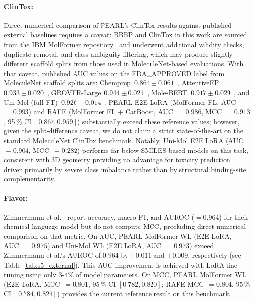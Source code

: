 \documentclass[9pt,a4paper]{article}
\begin{document}
\paragraph{ClinTox:}
Direct numerical comparison of PEARL's ClinTox results against published external baselines
requires a caveat: BBBP and ClinTox in this work are sourced from the IBM MolFormer
repository~\cite{ross2022molformer} and underwent additional validity checks, duplicate removal,
and class-ambiguity filtering, which may produce slightly different scaffold splits from
those used in MoleculeNet-based evaluations.
With that caveat, published AUC values on the FDA\_APPROVED label from MoleculeNet scaffold
splits are: Chemprop~$0.864 \pm 0.061$~\cite{yang2019chemprop},
AttentiveFP~$0.933 \pm 0.020$~\cite{xiong2020attentivefp},
GROVER-Large~$0.944 \pm 0.021$~\cite{rong2020grover},
Mole-BERT~$0.917 \pm 0.029$~\cite{xia2023molecbert}, and
Uni-Mol (full FT)~$0.926 \pm 0.014$~\cite{zhou2023unimol}.
PEARL E2E LoRA (MolFormer FL, AUC~$= 0.993$) and RAFE (MolFormer FL + CatBoost,
AUC~$= 0.986$, MCC~$= 0.913$, 95\,\% CI $[0.867, 0.959]$) substantially exceed these
reference values; however, given the split-difference caveat, we do not claim a strict
state-of-the-art on the standard MoleculeNet ClinTox benchmark.
Notably, Uni-Mol E2E LoRA (AUC~$= 0.904$, MCC~$= 0.282$) performs far below SMILES-based
models on this task, consistent with 3D geometry providing no advantage for toxicity prediction
driven primarily by severe class imbalance rather than by structural binding-site complementarity.

\paragraph{Flavor:}
Zimmermann et al.~\cite{zimmermann2024fart} report accuracy, macro-F1, and AUROC
($= 0.964$) for their chemical language model but do not compute MCC, precluding
direct numerical comparison on that metric.
On AUC, PEARL MolFormer WL (E2E LoRA, AUC~$= 0.975$) and Uni-Mol WL
(E2E LoRA, AUC~$= 0.973$) exceed Zimmermann et al.'s AUROC of $0.964$ by
$+0.011$ and $+0.009$, respectively (see Table~\ref{tab:s5_external}).
This AUC improvement is achieved with LoRA fine-tuning using only $3$-$4\%$ of
model parameters.
On MCC, PEARL MolFormer WL (E2E LoRA, MCC~$= 0.801$, 95\,\% CI $[0.782, 0.820]$;
RAFE MCC~$= 0.804$, 95\,\% CI $[0.784, 0.824]$) provides the current reference
result on this benchmark.



\end{document}
